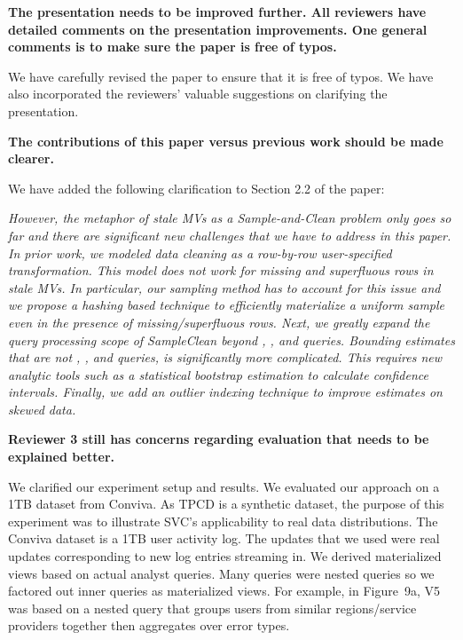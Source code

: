 \vspace{1.5em}

\textbf{The presentation needs to be improved further. All reviewers have detailed comments on the presentation improvements. One general comments is to make sure the paper is free of typos.}

We have carefully revised the paper to ensure that it is free of typos. We have also incorporated the reviewers' valuable suggestions on clarifying the presentation.

\vspace{1.5em}

\textbf{The contributions of this paper versus previous work should be made clearer.}

We have added the following clarification to Section 2.2 of the paper:

\emph{However, the metaphor of stale MVs as a Sample-and-Clean problem only goes so far and there are significant new challenges that we have to address in this paper. In prior work, we modeled data cleaning as a row-by-row user-specified transformation.
This model does not work for missing and superfluous rows in stale MVs. In particular, our sampling method has to account for this issue and we propose a hashing based technique to efficiently materialize a uniform sample even in the presence of missing/superfluous rows. Next, we greatly expand the query processing scope of SampleClean beyond \sumfunc, \countfunc, and \avgfunc queries. Bounding estimates that are not \sumfunc, \countfunc, and \avgfunc queries, is significantly more complicated. This requires new analytic tools such as a statistical bootstrap estimation to calculate confidence intervals. Finally, we add an outlier indexing technique to improve estimates on skewed data.}

\vspace{1.5em}

\textbf{Reviewer 3 still has concerns regarding evaluation that needs to be explained better.}

We clarified our experiment setup and results. 
We evaluated our approach on a 1TB dataset from Conviva. 
As TPCD is a synthetic dataset, the purpose of this experiment was to illustrate SVC's applicability to real data distributions. The Conviva dataset is a 1TB user activity log. The updates that we used were real updates corresponding to new log entries streaming in. We derived materialized views based on actual analyst queries. Many queries were nested queries so we factored out inner queries as materialized views. For example, in Figure~9a, V5 was based on a nested query that groups users from similar regions/service providers together then aggregates over error types.  %

